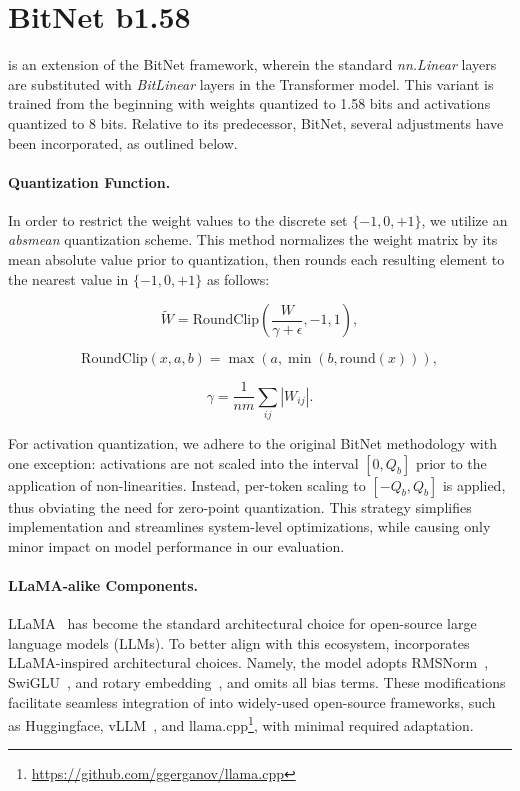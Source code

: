 \section{BitNet b1.58}

 is an extension of the BitNet framework, wherein the standard \emph{nn.Linear} layers are substituted with \emph{BitLinear} layers in the Transformer model. This variant is trained from the beginning with weights quantized to 1.58 bits and activations quantized to 8 bits. Relative to its predecessor, BitNet, several adjustments have been incorporated, as outlined below.

\paragraph{Quantization Function.} In order to restrict the weight values to the discrete set $\{-1, 0, +1\}$, we utilize an \emph{absmean} quantization scheme. This method normalizes the weight matrix by its mean absolute value prior to quantization, then rounds each resulting element to the nearest value in $\{-1, 0, +1\}$ as follows:

\begin{equation}
    \widetilde{W} = \mathrm{RoundClip}(\frac{W}{\gamma + \epsilon}, -1, 1),
\end{equation}

\begin{equation}
    \mathrm{RoundClip}(x, a, b) = \max(a, \min(b, \mathrm{round}(x))),
\end{equation}

\begin{equation}
    \gamma = \frac{1}{nm}\sum_{ij} |W_{ij}|.
\end{equation}

For activation quantization, we adhere to the original BitNet methodology with one exception: activations are not scaled into the interval $[0, Q_b]$ prior to the application of non-linearities. Instead, per-token scaling to $[-Q_b, Q_b]$ is applied, thus obviating the need for zero-point quantization. This strategy simplifies implementation and streamlines system-level optimizations, while causing only minor impact on model performance in our evaluation.

\paragraph{LLaMA-alike Components.}

LLaMA~\cite{llama, llama2} has become the standard architectural choice for open-source large language models (LLMs). To better align with this ecosystem,  incorporates LLaMA-inspired architectural choices. Namely, the model adopts RMSNorm~\cite{rmsnorm}, SwiGLU~\cite{swiglu}, and rotary embedding~\cite{rope}, and omits all bias terms. These modifications facilitate seamless integration of  into widely-used open-source frameworks, such as Huggingface, vLLM~\cite{vllm}, and llama.cpp\footnote{\url{https://github.com/ggerganov/llama.cpp}}, with minimal required adaptation.

